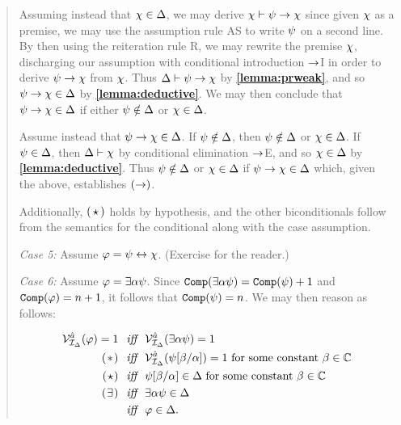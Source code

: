 \begin{quote}
  Assuming instead that $\chi\in\Delta$, we may derive $\chi\vdash\psi\rightarrow\chi$ since given $\chi$ as a premise, we may use the assumption rule AS to write $\psi$ on a second line.
  By then using the reiteration rule R, we may rewrite the premise $\chi$, discharging our assumption with conditional introduction $\rightarrow$I in order to derive $\psi\rightarrow\chi$ from $\chi$. 
  Thus $\Delta\vdash\psi\rightarrow\chi$ by \textbf{\ref{lemma:prweak}}, and so $\psi\rightarrow\chi\in\Delta$ by \textbf{\ref{lemma:deductive}}.
  We may then conclude that $\psi\rightarrow\chi\in\Delta$ if either $\psi\notin\Delta$ or $\chi\in\Delta$.

  Assume instead that $\psi\rightarrow\chi\in\Delta$.
  If $\psi\notin\Delta$, then $\psi\notin\Delta$ or $\chi\in\Delta$.
  If $\psi\in\Delta$, then $\Delta\vdash\chi$ by conditional elimination $\rightarrow$E, and so $\chi\in\Delta$ by \textbf{\ref{lemma:deductive}}.
  Thus $\psi\notin\Delta$ or $\chi\in\Delta$ if $\psi\rightarrow\chi\in\Delta$ which, given the above, establishes $(\rightarrow)$.  

  Additionally, $(\hspace{1.6pt}\star\hspace{1.6pt})$ holds by hypothesis, and the other biconditionals follow from the semantics for the conditional along with the case assumption.

  \textit{Case 5:}
  Assume $\varphi=\psi\leftrightarrow\chi$. (Exercise for the reader.)

  \textit{Case 6:}
  Assume $\varphi=\exists \alpha\psi$.
  Since $\texttt{Comp}(\exists \alpha\psi)=\texttt{Comp}(\psi)+1$ and $\texttt{Comp}(\varphi)=n+1$, it follows that $\texttt{Comp}(\psi)=n$.
  We may then reason as follows:

  \vspace{-.2in}
  \begin{align*}
    \mathcal{V}_{\mathcal{I}_{\Delta}}^{\hat{a}}(\varphi)=1 &\textit{ ~iff~ } \mathcal{V}_{\mathcal{I}_{\Delta}}^{\hat{a}}(\exists \alpha\psi)=1\\
      (\hspace{1pt}\ast\hspace{1pt}) &\textit{ ~iff~ } \mathcal{V}_{\mathcal{I}_{\Delta}}^{\hat{a}}(\psi[\beta/\alpha])=1 \text{ for some constant } \beta\in\mathbb{C}\\
      (\hspace{.7pt}\star\hspace{.7pt}) &\textit{ ~iff~ } \psi[\beta/\alpha]\in\Delta \text{ for some constant } \beta\in\mathbb{C}\\ 
      (\hspace{.7pt}\exists\hspace{.7pt}) &\textit{ ~iff~ } \exists \alpha\psi\in\Delta \\
      &\textit{ ~iff~ } \varphi\in\Delta.
  \end{align*}


\end{quote}
